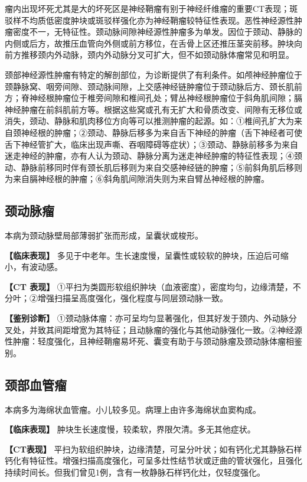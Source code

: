 瘤内出现坏死尤其是大的坏死区是神经鞘瘤有别于神经纤维瘤的重要CT表现；斑驳样不均质低密度肿块或斑驳样强化亦为神经鞘瘤较特征性表现。恶性神经源性肿瘤密度不一，无特征性。颈动脉间隙神经源性肿瘤多为单发。因位于颈动、静脉的内侧或后方，故推压血管向外侧或前方移位，在舌骨上区还推压茎突前移。肿块向前方推移颈内外动脉，颈内外动脉分叉可扩大，但不如颈动脉体瘤常见和明显。

颈部神经源性肿瘤有特定的解剖部位，为诊断提供了有利条件。如颅神经肿瘤位于颈静脉窝、咽旁间隙、颈动脉间隙，上交感神经链肿瘤位于颈动脉后方、颈长肌前方；脊神经根肿瘤位于椎旁间隙和椎间孔处；臂丛神经根肿瘤位于斜角肌间隙；膈神经肿瘤在前斜肌前方等。根据这些窝或孔有无扩大和骨质改变、间隙有无移位或消失，颈动、静脉和肌肉移位方向等可以推测肿瘤的起源。如：①椎间孔扩大为来自颈神经根的肿瘤；②颈动、静脉后移多为来自舌下神经的肿瘤（舌下神经者可使舌下神经管扩大，临床出现声嘶、吞咽障碍等症状）；③颈动、静脉前移多为来自迷走神经的肿瘤，亦有人认为颈动、静脉分离为迷走神经肿瘤的特征性表现；④颈动、静脉前移同时伴有颈长肌后移则为来自交感神经链的肿瘤；⑤前斜角肌后移则为来自膈神经根的肿瘤；⑥斜角肌间隙消失则为来自臂丛神经根的肿瘤。

\subsection{颈动脉瘤}

本病为颈动脉壁局部薄弱扩张而形成，呈囊状或梭形。

\textbf{【临床表现】}
多见于中老年。生长速度慢，呈囊性或较软的肿块，压迫后可缩小，有波动感。

\textbf{【CT 表现】}
①平扫为类圆形软组织肿块（血液密度），密度均匀，边缘清楚，不分叶；②增强扫描呈高度强化，强化程度与同层颈动脉一致。

\textbf{【鉴别诊断】}
①颈动脉体瘤：亦可呈均匀显著强化，但其好发于颈内、外动脉分叉处，并致其间距增宽为其特征；且动脉瘤的强化与其他动脉强化一致。②神经源性肿瘤：轻度强化，且神经鞘瘤易坏死、囊变有助于与颈动脉瘤及颈动脉体瘤相鉴别。

\subsection{颈部血管瘤}

本病多为海绵状血管瘤。小儿较多见。病理上由许多海绵状血窦构成。

\textbf{【临床表现】} 肿块生长速度慢，较柔软，界限欠清。多无其他症状。

\textbf{【CT表现】}
平扫为软组织肿块，边缘清楚，可呈分叶状；如有钙化尤其静脉石样钙化有特征性。增强扫描高度强化，可呈多灶性结节状或迂曲的管状强化，且强化持续时间长。但我们曾见1例，含有一枚静脉石样钙化灶，仅轻度强化。

